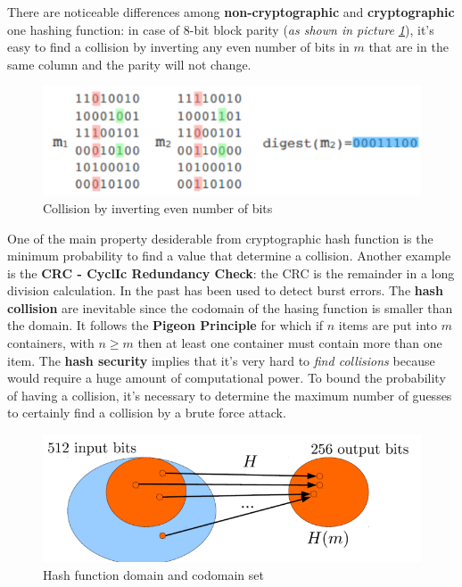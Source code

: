 \documentclass[10pt,a4paper]{report}
\begin{document}
There are noticeable differences among \textbf{non-cryptographic} and \textbf{cryptographic} one hashing function: in case of 8-bit block parity (\textit{as shown in picture \ref{8-bit-parity}}), it's easy to find a collision by inverting any even number of bits in $m$ that are in the same column and the parity will not change.
\begin{figure}[h]
	\centering
	\includegraphics[scale=0.50]{images/Pasted image 20230315112141.png}
	\caption{Collision by inverting even number of bits}
\label{8-bit-parity}
\end{figure}


One of the main property desiderable from cryptographic hash function is the minimum probability to find a value that determine a collision. Another example is the \textbf{CRC - CyclIc Redundancy Check}: the CRC is the remainder in a long division calculation. In the past has been used to detect burst errors.
The \textbf{hash collision} are inevitable since the codomain of the hasing function is smaller than the domain. It follows the \textbf{Pigeon Principle} for which if $n$ items are put into $m$ containers, with $n \ge m$ then at least one container must contain more than one item.
The \textbf{hash security} implies that it's very hard to \textit{find collisions} because would require a huge amount of computational power.
To bound the probability of having a collision, it's necessary to determine the maximum number of guesses to certainly find a collision by a brute force attack.

\begin{figure}[h]
	\centering
	\includegraphics[scale=0.40]{images/Pasted image 20230315113050.png}
	\caption{Hash function domain and codomain set}
\label{hash-domain}
\end{figure}
\end{document}
